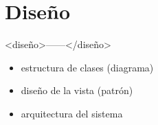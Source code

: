 \chapter{Diseño}
\label{chap:diseño}

<diseño>------</diseño>

\begin{itemize}
\item estructura de clases (diagrama)
\item diseño de la vista (patrón)
\item arquitectura del sistema 
\end{itemize}
